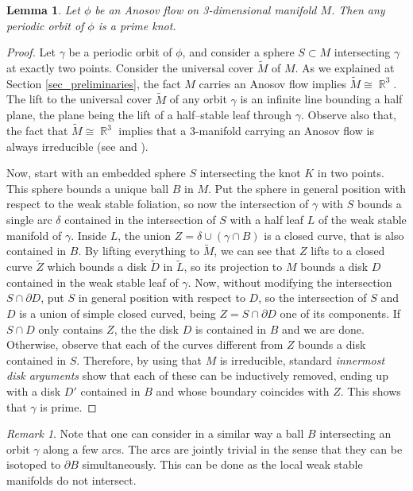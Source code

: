 \documentclass[12pt]{amsart}
\newtheorem{lemma}[theorem]{Lemma}
\theoremstyle{definition}
\theoremstyle{remark}
\newtheorem{remark}[theorem]{Remark}
\DeclareMathOperator{\R}{\mathbb{R}}
\begin{document}
\begin{lemma}\label{lem:prime}
Let $\phi$ be an Anosov flow on  3-dimensional manifold $M$. Then any periodic orbit of $\phi$ is a prime knot.
\end{lemma}

\begin{proof}
Let $\gamma$ be a periodic orbit of $\phi$, and consider a sphere $S\subset M$ intersecting $\gamma$ at exactly two points. Consider the universal cover $\tilde M$ of $M$. As we explained at Section \ref{sec_preliminaries}, the fact $M$ carries an Anosov flow implies $\tilde M\cong\R^3$. The lift to the universal cover $\tilde M$ of any orbit $\gamma$ is an infinite line bounding a half plane, the plane being the lift of a half--stable leaf through $\gamma$. Observe also that, the fact that $\tilde M\cong\R^3$ implies that a 3-manifold carrying an Anosov flow is always irreducible (see \cite{Rosenberg1968} and \cite{Novikov1965Foliations}).


Now, start with an embedded sphere $S$ intersecting the knot $K$ in two points. This sphere bounds a unique ball $B$ 
in $M$. Put the sphere in general position with respect to the weak stable foliation, so now the intersection of 
$\gamma$ with $S$ bounds a single arc $\delta$ contained in the intersection of $S$ with a half leaf $L$ of the weak stable manifold of $\gamma$. Inside $L$, the union $Z=\delta\cup (\gamma \cap B)$ is a closed curve, that is also contained in $B$. By lifting everything to $\tilde M$, we can see that $Z$ lifts to a closed curve $\tilde Z$ which bounds a disk $\tilde D$ in $\tilde L$,
so its projection to $M$ bounds a disk $D$ contained in the weak stable leaf of $\gamma$. 
Now, without modifying the intersection $S\cap \partial D$, put $S$ in general position with respect to $D$, so the intersection of $S$ and $D$ is a union of simple closed curved, being $Z=S\cap\partial D$ one of its components. If $S\cap D$ only contains $Z$, the the disk $D$ is contained in $B$ and we are done. Otherwise, observe that each of the curves different from $Z$ bounds a disk contained in $S$. Therefore, by using that $M$ is irreducible, standard \emph{innermost disk arguments} show that each of these
can be inductively removed, ending up with a disk $D'$ contained in $B$ and whose boundary coincides with $Z$. This shows that $\gamma$ is prime.
\end{proof}

\begin{remark}\label{rem:several_arcs}
    Note that one can consider in a similar way a ball $B$ intersecting an orbit $\gamma$ along a few arcs. The arcs are jointly trivial in the sense that they can be isotoped to $\partial B$ simultaneously. This can be done as the local weak stable manifolds do not intersect.
\end{remark}
\end{document}
